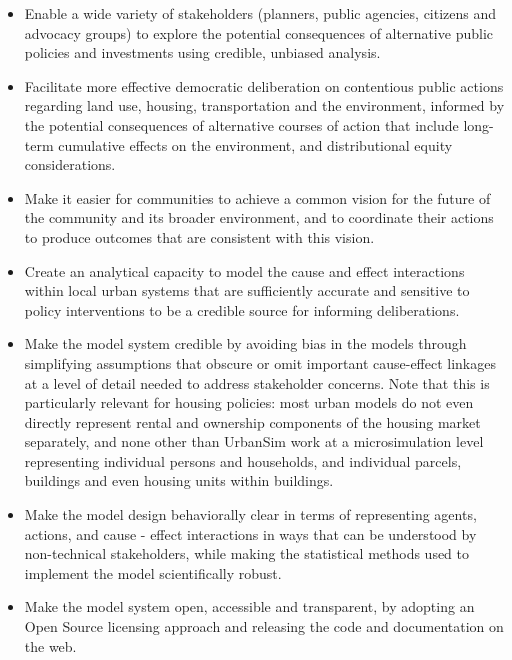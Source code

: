 \begin{itemize}

    \item Enable a wide variety of stakeholders (planners, public agencies, citizens and advocacy groups) to explore the potential consequences of alternative public policies and investments using credible, unbiased analysis.
    
    \item Facilitate more effective democratic deliberation on contentious public actions regarding land use, housing, transportation and the environment, informed by the potential consequences of alternative courses of action that include long-term cumulative effects on the environment, and distributional equity considerations.
    
    \item Make it easier for communities to achieve a common vision for the future of the community and its broader environment, and to coordinate their actions to produce outcomes that are consistent with this vision.
    
    \item Create an analytical capacity to model the cause and effect interactions within local urban systems that are sufficiently accurate and sensitive to policy interventions to be a credible source for informing deliberations.
    
    \item Make the model system credible by avoiding bias in the models through simplifying assumptions that obscure or omit important cause-effect linkages at a level of detail needed to address stakeholder concerns. Note that this is particularly relevant for housing policies: most urban models do not even directly represent rental and ownership components of the housing market separately, and none other than UrbanSim work at a microsimulation level representing individual persons and households, and individual parcels, buildings and even housing units within buildings.
    
    \item Make the model design behaviorally clear in terms of representing agents, actions, and cause - effect interactions in ways that can be understood by non-technical stakeholders, while making the statistical methods used to implement the model scientifically robust.
    
    \item Make the model system open, accessible and transparent, by adopting an Open Source licensing approach and releasing the code and documentation on the web.
    

\end{itemize}
